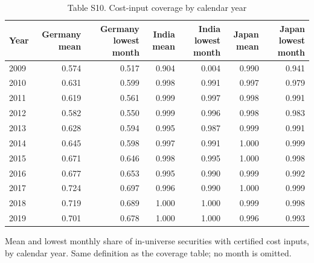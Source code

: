\begin{table}[t]
\centering
\small
\caption{Table S10. Cost-input coverage by calendar year}
\label{tab:s10}
\begin{tabular}{lrrrrrr}
\toprule
Year & Germany mean & Germany lowest month & India mean & India lowest month & Japan mean & Japan lowest month \\
\midrule
2009 & 0.574 & 0.517 & 0.904 & 0.004 & 0.990 & 0.941 \\
2010 & 0.631 & 0.599 & 0.998 & 0.991 & 0.997 & 0.979 \\
2011 & 0.619 & 0.561 & 0.999 & 0.997 & 0.998 & 0.991 \\
2012 & 0.582 & 0.550 & 0.999 & 0.996 & 0.998 & 0.983 \\
2013 & 0.628 & 0.594 & 0.995 & 0.987 & 0.999 & 0.991 \\
2014 & 0.645 & 0.598 & 0.997 & 0.991 & 1.000 & 0.999 \\
2015 & 0.671 & 0.646 & 0.998 & 0.995 & 1.000 & 0.998 \\
2016 & 0.677 & 0.653 & 0.995 & 0.990 & 0.999 & 0.992 \\
2017 & 0.724 & 0.697 & 0.996 & 0.990 & 1.000 & 0.999 \\
2018 & 0.719 & 0.689 & 1.000 & 1.000 & 0.999 & 0.998 \\
2019 & 0.701 & 0.678 & 1.000 & 1.000 & 0.996 & 0.993 \\
\bottomrule
\end{tabular}
\par\vspace{2pt}
\parbox{\textwidth}{\footnotesize Mean and lowest monthly share of in-universe securities with certified cost inputs, by calendar year. Same definition as the coverage table; no month is omitted.}
\end{table}
